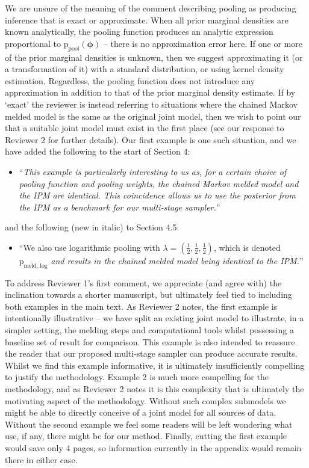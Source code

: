 \documentclass[
  10pt,
  a4paper,
]{article}
\providecommand{\tightlist}{%
  \setlength{\itemsep}{0pt}\setlength{\parskip}{0pt}}
\newcommand{\pd}{\text{p}}
\begin{document}
We are unsure of the meaning of the comment describing pooling as
producing inference that is exact or approximate. When all prior
marginal densities are known analytically, the pooling function produces
an analytic expression proportional to
\(\pd_{\text{pool}}(\boldsymbol{\phi})\) -- there is no approximation
error here. If one or more of the prior marginal densities is unknown,
then we suggest approximating it (or a transformation of it) with a
standard distribution, or using kernel density estimation. Regardless,
the pooling function does not introduce any approximation in addition to
that of the prior marginal density estimate. If by `exact' the reviewer
is instead referring to situations where the chained Markov melded model
is the same as the original joint model, then we wish to point our that
a suitable joint model must exist in the first place (see our response
to Reviewer 2 for further details). Our first example is one such
situation, and we have added the following to the start of Section 4:

\begin{itemize}
\tightlist
\item
  ``\emph{This example is particularly interesting to us as, for a
  certain choice of pooling function and pooling weights, the chained
  Markov melded model and the IPM are identical. This coincidence allows
  us to use the posterior from the IPM as a benchmark for our
  multi-stage sampler.}''
\end{itemize}

and the following (new in italic) to Section 4.5:

\begin{itemize}
\tightlist
\item
  ``We also use logarithmic pooling with
  \(\lambda = (\frac{1}{2}, \frac{1}{2}, \frac{1}{2})\), which is
  denoted \(\pd_{\text{meld, log}}\) \emph{and results in the chained
  melded model being identical to the IPM.}''
\end{itemize}

To address Reviewer 1's first comment, we appreciate (and agree with)
the inclination towards a shorter manuscript, but ultimately feel tied
to including both examples in the main text. As Reviewer 2 notes, the
first example is intentionally illustrative -- we have split an existing
joint model to illustrate, in a simpler setting, the melding steps and
computational tools whilst possessing a baseline set of result for
comparison. This example is also intended to reassure the reader that
our proposed multi-stage sampler can produce accurate results. Whilst we
find this example informative, it is ultimately insufficiently
compelling to justify the methodology. Example 2 is much more compelling
for the methodology, and as Reviewer 2 notes it is this complexity that
is ultimately the motivating aspect of the methodology. Without such
complex submodels we might be able to directly conceive of a joint model
for all sources of data. Without the second example we feel some readers
will be left wondering what use, if any, there might be for our method.
Finally, cutting the first example would save only 4 pages, so
information currently in the appendix would remain there in either case.
\end{document}
